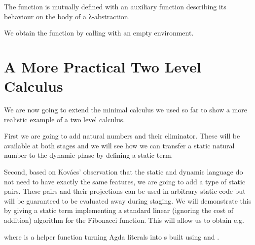 \documentclass{article}
\begin{document}





\begin{AgdaSuppressSpace}
\end{AgdaSuppressSpace}

The function  is mutually defined with an auxiliary
function describing its behaviour on the body of a λ-abstraction.

\begin{AgdaSuppressSpace}
\end{AgdaSuppressSpace}

We obtain the  function by calling  with an
empty environment.

\begin{AgdaSuppressSpace}
\end{AgdaSuppressSpace}


\section{A More Practical Two Level Calculus}

We are now going to extend the minimal calculus we used so far to
show a more realistic example of a two level calculus.

First we are going to add natural numbers and their eliminator.
These will be available at both stages and we will see how we
can transfer a static natural number to the dynamic phase by
defining a static  term.

Second, based on Kov{\'{a}}cs' observation that the static and
dynamic language do not need to have exactly the same features,
we are going to add a type of static pairs.
%
These pairs and their projections can be used in arbitrary static
code but will be guaranteed to be evaluated away during staging.
%
We will demonstrate this by giving a static term 
implementing a standard linear (ignoring the cost of addition)
algorithm for the Fibonacci function.
%
This will allow us to obtain e.g.


\noindent where  is a helper function turning Agda
literals into s built using  and .
\end{document}
